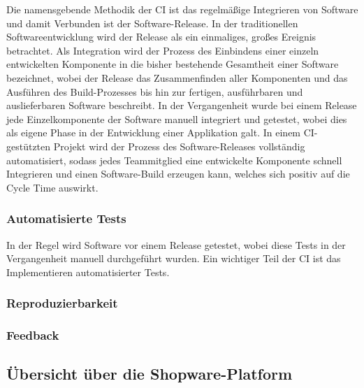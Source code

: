 Die namensgebende Methodik der CI ist das regelmäßige Integrieren von Software und damit Verbunden ist der
Software-Release.
In der traditionellen Softwareentwicklung wird der Release als ein einmaliges, großes Ereignis betrachtet.
Als Integration wird der Prozess des Einbindens einer einzeln entwickelten Komponente in die bisher bestehende
Gesamtheit einer Software bezeichnet, wobei der Release das Zusammenfinden aller Komponenten und das Ausführen des
Build-Prozesses bis hin zur fertigen, ausführbaren und auslieferbaren Software beschreibt.
In der Vergangenheit wurde bei einem Release jede Einzelkomponente der Software manuell integriert und getestet, wobei
dies als eigene Phase in der Entwicklung einer Applikation galt.
In einem CI-gestützten Projekt wird der Prozess des Software-Releases vollständig automatisiert, sodass jedes
Teammitglied eine entwickelte Komponente schnell Integrieren und einen Software-Build erzeugen kann, welches sich
positiv auf die Cycle Time auswirkt.

\subsubsection{Automatisierte Tests}

In der Regel wird Software vor einem Release getestet, wobei diese Tests in der Vergangenheit manuell durchgeführt
wurden.
Ein wichtiger Teil der CI ist das Implementieren automatisierter Tests.

\subsubsection{Reproduzierbarkeit}

\subsubsection{Feedback}

\subsection{Übersicht über die Shopware-Platform} \label{subsec:02-background-2}

